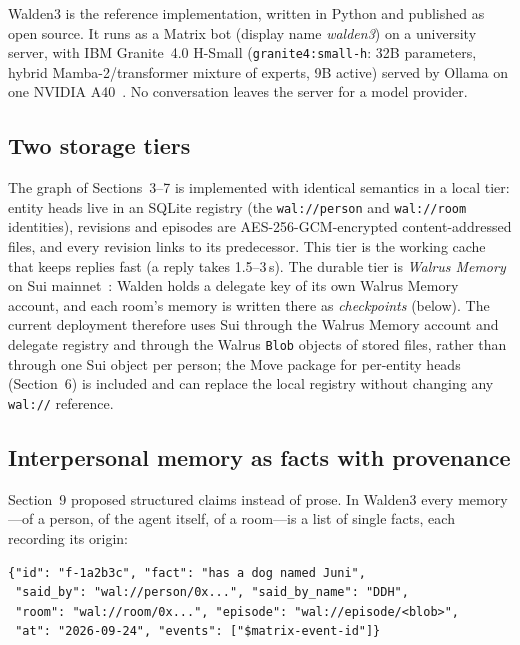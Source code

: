 \documentclass[11pt]{article}
\begin{document}
Walden3 is the reference implementation, written in Python and published as open source. It runs as a Matrix bot (display name \emph{walden3}) on a university server, with IBM Granite~4.0 H-Small (\texttt{granite4:small-h}: 32B parameters, hybrid Mamba-2/transformer mixture of experts, 9B active) served by Ollama on one NVIDIA A40~\cite{granite4}. No conversation leaves the server for a model provider.

\subsection{Two storage tiers}

The graph of Sections~3--7 is implemented with identical semantics in a local tier: entity heads live in an SQLite registry (the \texttt{wal://person} and \texttt{wal://room} identities), revisions and episodes are AES-256-GCM-encrypted content-addressed files, and every revision links to its predecessor. This tier is the working cache that keeps replies fast (a reply takes 1.5--3\,s). The durable tier is \emph{Walrus Memory} on Sui mainnet~\cite{walrus-memory-docs}: Walden holds a delegate key of its own Walrus Memory account, and each room's memory is written there as \emph{checkpoints} (below). The current deployment therefore uses Sui through the Walrus Memory account and delegate registry and through the Walrus \texttt{Blob} objects of stored files, rather than through one Sui object per person; the Move package for per-entity heads (Section~6) is included and can replace the local registry without changing any \texttt{wal://} reference.

\subsection{Interpersonal memory as facts with provenance}

Section~9 proposed structured claims instead of prose. In Walden3 every memory---of a person, of the agent itself, of a room---is a list of single facts, each recording its origin:

\begin{lstlisting}
{"id": "f-1a2b3c", "fact": "has a dog named Juni",
 "said_by": "wal://person/0x...", "said_by_name": "DDH",
 "room": "wal://room/0x...", "episode": "wal://episode/<blob>",
 "at": "2026-09-24", "events": ["$matrix-event-id"]}
\end{lstlisting}
\end{document}
